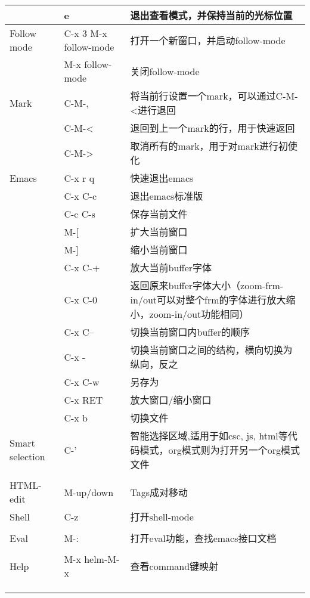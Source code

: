 \documentclass[10pt,a4paper]{article}
\begin{document}
\begin{center}
\begin{tabular}{lll}
 & e & 退出查看模式，并保持当前的光标位置\\
\hline
Follow mode & C-x 3 M-x follow-mode & 打开一个新窗口，并启动follow-mode\\
 & M-x follow-mode & 关闭follow-mode\\
\hline
Mark & C-M-, & 将当前行设置一个mark，可以通过C-M-<进行退回\\
 & C-M-< & 退回到上一个mark的行，用于快速返回\\
 & C-M-> & 取消所有的mark，用于对mark进行初使化\\
\hline
Emacs & C-x r q & 快速退出emacs\\
 & C-x C-c & 退出emacs标准版\\
 & C-c C-s & 保存当前文件\\
 & M-[ & 扩大当前窗口\\
 & M-] & 缩小当前窗口\\
 & C-x C-+ & 放大当前buffer字体\\
 & C-x C-0 & 返回原来buffer字体大小（zoom-frm-in/out可以对整个frm的字体进行放大缩小，zoom-in/out功能相同）\\
 & C-x C-- & 切换当前窗口内buffer的顺序\\
 & C-x - & 切换当前窗口之间的结构，横向切换为纵向，反之\\
 & C-x C-w & 另存为\\
 & C-x RET & 放大窗口/缩小窗口\\
 & C-x b & 切换文件\\
\hline
Smart selection & C-' & 智能选择区域,适用于如csc, js, html等代码模式，org模式则为打开另一个org模式文件\\
 &  & \\
\hline
HTML-edit & M-up/down & Tags成对移动\\
\hline
Shell & C-z & 打开shell-mode\\
 &  & \\
\hline
Eval & M-: & 打开eval功能，查找emacs接口文档\\
 &  & \\
\hline
Help & M-x helm-M-x & 查看command键映射\\
 &  & \\
 &  & \\
 &  & \\
\hline
\end{tabular}
\end{center}
\end{document}
